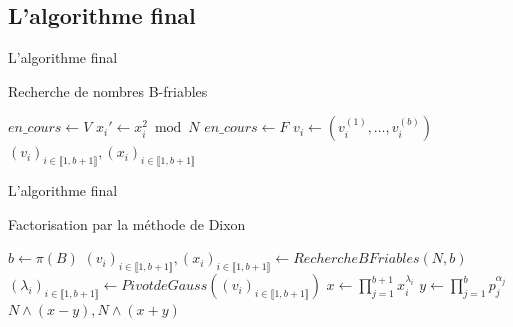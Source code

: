 \documentclass{beamer}
\begin{document}
\subsection{L'algorithme final}

\begin{frame}{L'algorithme final}
    \begin{algorithm}[H]
    \caption{Recherche de nombres B-friables}
    \small
    \begin{algorithmic}[1]
        \Statex
            \State $en\_cours \gets V$
                \State $x_i' \gets x_i^2 \bmod N$
                    \State $en\_cours \gets F$
                    \State $v_i \gets (v_i^{(1)}, \dots, v_i^{(b)})$
                \EndIf
            \EndWhile
        \EndFor
        \Statex
        \Return $(v_i)_{i \in \llbracket 1,b+1 \rrbracket}, (x_i)_{i \in \llbracket 1,b+1 \rrbracket}$
    \end{algorithmic}
    \end{algorithm}
\end{frame}

\begin{frame}{L'algorithme final}
    \begin{algorithm}[H]
    \caption{Factorisation par la méthode de Dixon}
    \begin{algorithmic}[1]
        \Statex
        \State $b \gets\pi(B)$
        \State $(v_i)_{i \in \llbracket 1,b+1 \rrbracket}, (x_i)_{i \in \llbracket 1,b+1 \rrbracket} \gets Recherche BFriables(N, b)$
        \State $(\lambda_i)_{i \in \llbracket 1,b+1 \rrbracket} \gets PivotdeGauss((v_i)_{i \in \llbracket 1,b+1 \rrbracket})$
        \State $x \gets \prod_{j=1}^{b+1}x_i^{\lambda_i}$
        \State $y \gets \prod_{j=1}^b p_j^{\alpha_j}$
        \Statex
        \Return $N \land(x-y), N\land(x+y)$
    \end{algorithmic}
    \end{algorithm}
\end{frame}
\end{document}
